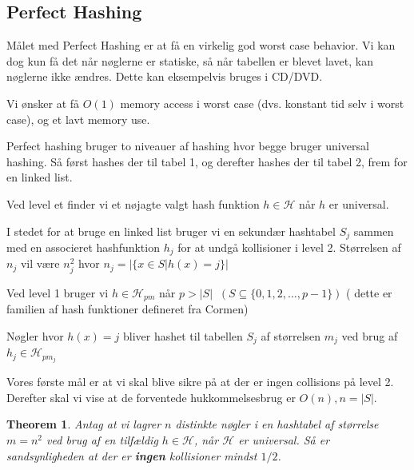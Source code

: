 \documentclass[11pt]{article}
\newtheorem{theorem}{Theorem}
\theoremstyle{definition}
\theoremstyle{remark}
\begin{document}
\subsection{Perfect Hashing}

Målet med Perfect Hashing er at få en virkelig god worst case behavior. Vi kan dog kun få det når nøglerne er statiske, så når tabellen er blevet lavet, kan nøglerne ikke ændres. Dette kan eksempelvis bruges i CD/DVD.

Vi ønsker at få $O(1)$ memory access i worst case (dvs. konstant tid selv i worst case), og et lavt memory use.

Perfect hashing bruger to niveauer af hashing hvor begge bruger universal hashing. Så først hashes der til tabel 1, og derefter hashes der til tabel 2, frem for en linked list. 
  
Ved level et finder vi et nøjagte valgt hash funktion $h \in \mathcal{H}$ når $h$ er universal.

I stedet for at bruge en linked list bruger vi en sekundær hashtabel $S_{j}$ sammen med en associeret hashfunktion $h_{j}$ for at undgå kollisioner i level 2. Størrelsen af $n_{j}$ vil være $n_{j}^{2}$ hvor $n_{j} = |\{x \in S | h(x) = j\}|$

Ved level 1 bruger vi $h \in \mathcal{H}_{pm}$ når $p > |S|\;\;(S \subseteq \{0, 1, 2, \ldots, p-1\})$ ( dette er familien af hash funktioner defineret fra Cormen)

Nøgler hvor $h(x) = j$ bliver hashet til tabellen $S_{j}$ af størrelsen $m_{j}$ ved brug af $h_{j} \in \mathcal{H}_{pm_{j}}$


Vores første mål er at vi skal blive sikre på at der er ingen collisions på level 2. Derefter skal vi vise at de forventede hukkommelsesbrug er $O(n), n = |S|$.

\begin{theorem}
  Antag at vi lagrer $n$ distinkte nøgler i en hashtabel af størrelse $m = n^{2}$ ved brug af en tilfældig $h \in \mathcal{H}$, når $\mathcal{H}$ er universal. Så er sandsynligheden at der er \textbf{ingen} kollisioner mindst $1/2$.
\end{theorem}
\end{document}
